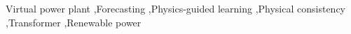 Virtual power plant \sep Forecasting \sep Physics-guided learning \sep Physical consistency \sep Transformer \sep Renewable power
